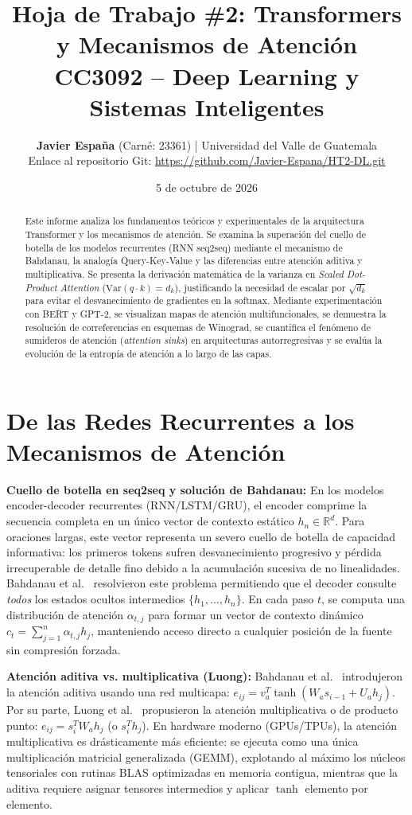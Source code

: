 \documentclass[10pt,letterpaper]{article}
\title{\vspace{-1.3cm}\textbf{\Large Hoja de Trabajo \#2: Transformers y Mecanismos de Atención}\\
\normalsize CC3092 -- Deep Learning y Sistemas Inteligentes}
\author{\textbf{Javier España} (Carné: 23361) \quad | \quad Universidad del Valle de Guatemala\\
\normalsize Enlace al repositorio Git: \url{https://github.com/Javier-Espana/HT2-DL.git}}
\date{5 de octubre de 2026\vspace{-0.65cm}}
\begin{document}
\maketitle

\begin{abstract}
\small
Este informe analiza los fundamentos teóricos y experimentales de la arquitectura Transformer y los mecanismos de atención. Se examina la superación del cuello de botella de los modelos recurrentes (RNN seq2seq) mediante el mecanismo de Bahdanau, la analogía Query-Key-Value y las diferencias entre atención aditiva y multiplicativa. Se presenta la derivación matemática de la varianza en \textit{Scaled Dot-Product Attention} ($\mathrm{Var}(q\cdot k)=d_k$), justificando la necesidad de escalar por $\sqrt{d_k}$ para evitar el desvanecimiento de gradientes en la softmax. Mediante experimentación con \textsc{BERT} y \textsc{GPT-2}, se visualizan mapas de atención multifuncionales, se demuestra la resolución de correferencias en esquemas de Winograd, se cuantifica el fenómeno de sumideros de atención (\textit{attention sinks}) en arquitecturas autorregresivas y se evalúa la evolución de la entropía de atención a lo largo de las capas.
\end{abstract}

\vspace{-0.25cm}
\section{De las Redes Recurrentes a los Mecanismos de Atención}
\label{sec:rnn_atencion}

\textbf{Cuello de botella en seq2seq y solución de Bahdanau:}
En los modelos encoder-decoder recurrentes (RNN/LSTM/GRU), el encoder comprime la secuencia completa en un único vector de contexto estático $h_n \in \mathbb{R}^d$. Para oraciones largas, este vector representa un severo cuello de botella de capacidad informativa: los primeros tokens sufren desvanecimiento progresivo y pérdida irrecuperable de detalle fino debido a la acumulación sucesiva de no linealidades. Bahdanau et al.~\cite{bahdanau2014neural} resolvieron este problema permitiendo que el decoder consulte \textit{todos} los estados ocultos intermedios $\{h_1, \dots, h_n\}$. En cada paso $t$, se computa una distribución de atención $\alpha_{t,j}$ para formar un vector de contexto dinámico $c_t = \sum_{j=1}^n \alpha_{t,j} h_j$, manteniendo acceso directo a cualquier posición de la fuente sin compresión forzada.

\textbf{Atención aditiva vs. multiplicativa (Luong):}
Bahdanau et al.~\cite{bahdanau2014neural} introdujeron la atención aditiva usando una red multicapa: $e_{ij} = v_a^T \tanh(W_a s_{i-1} + U_a h_j)$. Por su parte, Luong et al.~\cite{luong2015effective} propusieron la atención multiplicativa o de producto punto: $e_{ij} = s_i^T W_a h_j$ (o $s_i^T h_j$). En hardware moderno (GPUs/TPUs), la atención multiplicativa es drásticamente más eficiente: se ejecuta como una única multiplicación matricial generalizada (GEMM), explotando al máximo los núcleos tensoriales con rutinas BLAS optimizadas en memoria contigua, mientras que la aditiva requiere asignar tensores intermedios y aplicar $\tanh$ elemento por elemento.
\end{document}
